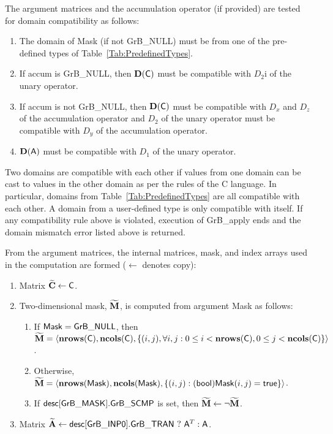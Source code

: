 The argument matrices and the accumulation 
operator (if provided) are tested for domain compatibility as follows:
\begin{enumerate}
	\item The domain of {\sf Mask} (if not {\sf GrB\_NULL}) must be from one of 
    the pre-defined types of Table~\ref{Tab:PredefinedTypes}.

	\item If {\sf accum} is {\sf GrB\_NULL}, then $\bold{D}({\sf C})$ must be 
    compatible with $D_2$i of the unary operator.

	\item If {\sf accum} is not {\sf GrB\_NULL}, then $\bold{D}({\sf C})$ must be
    compatible with $D_x$ and $D_z$ of the accumulation operator and 
    $D_2$ of the unary operator must be compatible with $D_y$ of the accumulation operator.

	\item $\bold{D}({\sf A})$ must be compatible with $D_1$ of the unary operator.
\end{enumerate}
Two domains are compatible with each other if values from one domain can be cast 
to values in the other domain as per the rules of the C language.
In particular, domains from Table~\ref{Tab:PredefinedTypes} are all compatible 
with each other. A domain from a user-defined type is only compatible with itself.
If any compatibility rule above is violated, execution of {\sf GrB\_apply} ends
and the domain mismatch error listed above is returned.

From the argument matrices, the internal matrices, mask, and index arrays used in 
the computation are formed ($\leftarrow$ denotes copy):
\begin{enumerate}
	\item Matrix ${\bf \widetilde{C}} \leftarrow {\sf C}$.

	\item Two-dimensional mask, ${\bf \widetilde{M}}$, is computed from 
    argument {\sf Mask} as follows:
	\begin{enumerate}

		\item	If ${\sf Mask} = {\sf GrB\_NULL}$, then ${\bf \widetilde{M}} = 
        \langle \bold{nrows}({\sf C}), \bold{ncols}({\sf C}), \{(i,j), 
        \forall i,j : 0 \leq i <  \bold{nrows}({\sf C}), 0 \leq j < 
        \bold{ncols}({\sf C}) \} \rangle$.

		\item	Otherwise, ${\bf \widetilde{M}} = \langle 
        \bold{nrows}({\sf Mask}), \bold{ncols}({\sf Mask}), \{(i,j) : 
        ({\sf bool}){\sf Mask}(i,j) = {\sf true}\} \rangle$.

		\item	If ${\sf desc[GrB\_MASK].GrB\_SCMP}$ is set, then 
        ${\bf \widetilde{M}} \leftarrow \neg {\bf \widetilde{M}}$.

	\end{enumerate}

	\item Matrix ${\bf \widetilde{A}} \leftarrow 
    {\sf desc[GrB\_INP0].GrB\_TRAN} \ ? \ {\sf A}^T : {\sf A}$.
    
\end{enumerate}

